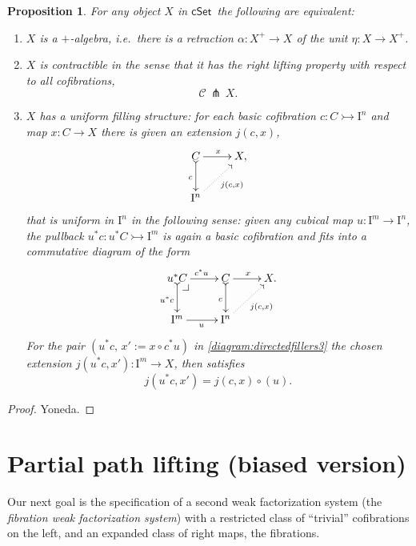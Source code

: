 \documentclass[11pt]{article}
\makeatletter
\newcommand{\cSet}{\ensuremath{\mathsf{cSet}}}
\newcommand{\pbcorner}[1][dr]{\save*!/#1-1.2pc/#1:(-1,1)@^{|-}\restore}
\newcommand{\mono}{\ensuremath{\rightarrowtail}}
\newcommand{\I}{\ensuremath{\mathrm{I}}}
\newtheorem{proposition}[theorem]{Proposition}
\theoremstyle{remark}
\theoremstyle{definition}
\makeatother
\begin{document}
\begin{proposition} For any object $X$ in \cSet\ the following are equivalent:
\begin{enumerate}
\item $X$ is a \emph{$+$-algebra}, i.e.\ there is a retraction $\alpha :X^+ \to X$ of the unit $\eta : X\to X^+$.
\item $X$ is  \emph{contractible} in the sense that it has the right lifting property with respect to all cofibrations,
\[
\mathcal{C}\, \pitchfork\,X.
\]
\item $X$ has a \emph{uniform filling structure}: 
for each basic cofibration $c : C \mono \I^{n}$ and map $x : C\to X$ there is given an extension $j(c,x)$,
\begin{equation}\label{diagram:directedfillers}
\xymatrix{
C \ar@{>->}[d]_{c} \ar[r]^{x} & X, \\
\I^{n}\ar@{.>}[ru]_{j(c,x)} &
}
\end{equation}
that is \emph{uniform in $\I^n$} in the following sense: given any cubical map $u : \I^m \to \I^n$, the pullback $u^*c : u^*C\mono \I^m$ is again a basic cofibration and fits into a commutative diagram of the form
\begin{equation}\label{diagram:directedfillers3}
\xymatrix{
u^*C \ar@{>->}[d]_{u^*c} \ar[r]^{c^*u} \pbcorner &  C \ar@{>->}[d]_{c} \ar[r]^{x} & X. \\
\I^{m} \ar[r]_{u} & \I^{n} \ar@{.>}[ru]_{j(c,x)} &
}
\end{equation}
For the pair $(u^*c,\, x' := x\circ c^*u)$ in \eqref{diagram:directedfillers3} the chosen extension $j(u^*c,x'): \I^m \to X$, then satisfies
\begin{equation}\label{eq:uniformfillers}
j(u^*c,x') = j(c,x)\circ (u).
\end{equation}
\end{enumerate}
\end{proposition}

\begin{proof}
Yoneda.
\end{proof}

\section{Partial path lifting (biased version)}

Our next goal is the specification of a second weak factorization system (the \emph{fibration weak factorization system}) with a restricted class of ``trivial'' cofibrations on the left, and an expanded class of right maps, the fibrations. 
\end{document}
